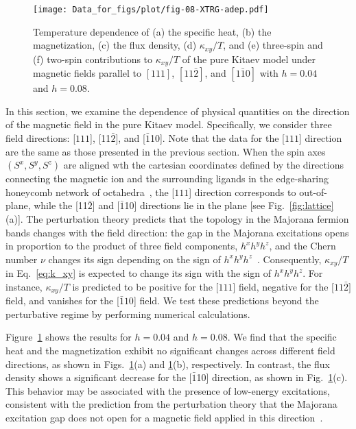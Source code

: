 \documentclass[twocolumn,superscriptaddress,showpacs, longbibliography, aps, prx]{revtex4-2}
\begin{document}
\begin{figure}[htb]
  \begin{center}
    \texttt{[image: Data\_for\_figs/plot/fig-08-XTRG-adep.pdf]}
  \end{center}  
  \caption{Temperature dependence of (a) the specific heat, (b) the magnetization, (c) the flux density, (d) $\kappa_{xy}/T$, and (e) three-spin and (f) two-spin contributions to $\kappa_{xy}/T$ of the pure Kitaev model under magnetic fields parallel to $[111]$, $[11\bar{2}]$, and $[1\bar{1}0]$ with $h=0.04$ and $h = 0.08$.
  }
  \label{fig:CMF_ab}
\end{figure}
In this section, we examine the dependence of physical quantities on the direction of the magnetic field in the pure Kitaev model.
Specifically, we consider three field directions:
[$111$], [11$\bar{2}$], and [$\bar{1}$10]. 
Note that the data for the [$111$] direction are the same as those presented in the previous section. 
When the spin axes $(S^x, S^y, S^z)$ are aligned wth the cartesian coordinates defined by the directions connecting the magnetic ion and the surrounding ligands in the edge-sharing honeycomb network of octahedra~\cite{Jackeli_PRL2009},  the [$111$] direction corresponds to out-of-plane, while the [11$\bar{2}$] and [$\bar{1}$10] directions lie in the plane [see Fig.~\ref{fig:lattice}(a)]. 
The perturbation theory predicts that the topology in the Majorana fermion bands changes with the field direction: the gap in the Majorana excitations opens in proportion to the product of three field components, $h^x h^y h^z$, and the Chern number $\nu$ changes its sign depending on the sign of $h^x h^y h^z$~\cite{Kitaev2006}. 
Consequently, $\kappa_{xy}/T$ in Eq.~\eqref{eq:k_xy} is expected to change its sign with the sign of $h^x h^y h^z$. 
For instance, $\kappa_{xy}/T$ is predicted to be positive for the [$111$] field, negative for the [$11\bar{2}]$ field, and vanishes for the [$\bar{1}10$] field.
We test these predictions beyond the perturbative regime by performing numerical calculations.

Figure~\ref{fig:CMF_ab} shows the results for  $h=0.04$ and $h=0.08$. 
We find that the specific heat and the magnetization exhibit no significant changes across different field directions, as shown in Figs.~\ref{fig:CMF_ab}(a) and \ref{fig:CMF_ab}(b), respectively. 
In contrast, the flux density shows a significant decrease for the [$\bar{1}$10] direction, as shown in Fig.~\ref{fig:CMF_ab}(c). 
This behavior may be associated with the presence of low-energy excitations, consistent with the prediction from the perturbation theory that the Majorana excitation gap does not open for a magnetic field applied in this direction~\cite{Kitaev2006}.
\end{document}

